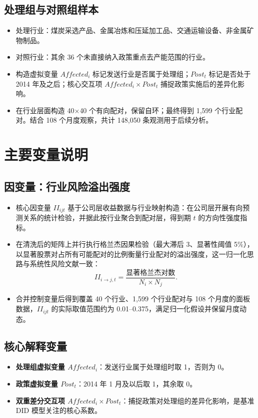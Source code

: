 \subsection{处理组与对照组样本}
\begin{itemize}
    \item 处理行业：煤炭采选产品、金属冶炼和压延加工品、交通运输设备、非金属矿物制品。
    \item 对照行业：其余 36 个未直接纳入政策重点去产能范围的行业。
    \item 构造虚拟变量 \(Affected_i\) 标记发送行业是否属于处理组；\(Post_t\) 标记是否处于 2014 年及之后；核心交互项 \(Affected_i \times Post_t\) 捕捉政策实施后的差异化影响。
    \item 在行业层面构造 40\(\times\)40 个有向配对，保留自环；最终得到 1,599 个行业配对。结合 108 个月度观察，共计 148{,}050 条观测用于后续分析。
\end{itemize}

\section{主要变量说明}
\label{sec:variable_definition}

\subsection{因变量：行业风险溢出强度}
\begin{itemize}
    \item 核心因变量 \(II_{ijt}\) 基于公司层收益数据与行业映射构造：在公司层开展有向预测关系的统计检验，并据此按行业聚合到配对层，得到期 \(t\) 的方向性强度指标。
    \item 在清洗后的矩阵上并行执行格兰杰因果检验（最大滞后 3、显著性阈值 5\%），以显著股票对占所有可能配对的比例衡量行业配对的溢出强度，这一归一化思路与系统性风险文献一致\citep{billio2012econometric,diebold2012better,diebold2014connectedness}：
    \begin{equation}
        II_{i\rightarrow j,t} = \frac{\text{显著格兰杰对数}}{N_i \times N_j}.
    \end{equation}
    \item 合并控制变量后得到覆盖 40 个行业、1,599 个行业配对与 108 个月度的面板数据，\(II_{ijt}\) 的实际取值范围约为 0.01--0.375，满足归一化假设并保留月度动态。

\end{itemize}

\subsection{核心解释变量}
\begin{itemize}
    \item \textbf{处理组虚拟变量 \(Affected_i\)}：发送行业属于处理组时取 1，否则为 0。
    \item \textbf{政策虚拟变量 \(Post_t\)}：2014 年 1 月及以后取 1，其余取 0。
    \item \textbf{双重差分交互项 \(Affected_i \times Post_t\)}：捕捉政策对处理组的差异化影响，是基准 DID 模型关注的核心系数。
\end{itemize}

